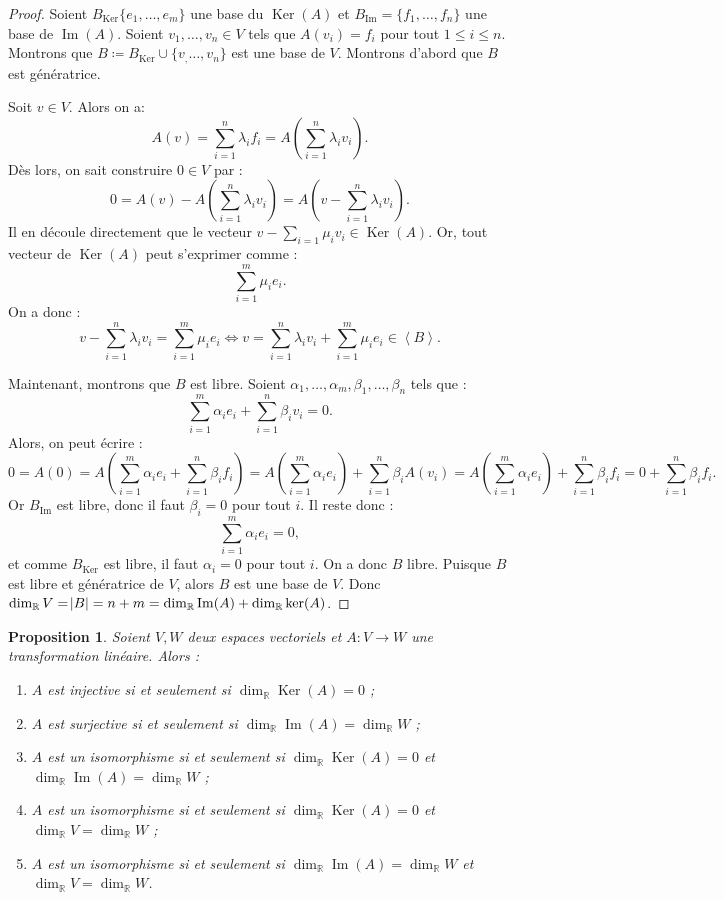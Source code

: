 \documentclass{article}
\DeclareMathOperator{\Ker}{Ker}
\DeclareMathOperator{\Imf}{Im}
\newcommand{\R}{\mathbb R}
\newcommand{\eng}[1]{\left\langle#1\right\rangle}
\newtheorem{prp}[thm]{Proposition}
\theoremstyle{definition}
\theoremstyle{remark}
\begin{document}
		\begin{proof} Soient $B_{\Ker}\{e_1, \ldots, e_m\}$ une base du $\Ker(A)$ et $B_{\Imf} = \{f_1, \ldots, f_n\}$ une base de $\Imf(A)$. Soient $v_1, \ldots, v_n \in V$
		tels que $A(v_i) = f_i$ pour tout $1 \leq i \leq n$. Montrons que $B \coloneqq B_{\Ker} \cup \{v_, \ldots, v_n\}$ est une base de $V$. Montrons d'abord que $B$
		est génératrice.

		Soit $v \in V$. Alors on a: \[A(v) = \sum_{i=1}^n\lambda_if_i = A\left(\sum_{i=1}^n\lambda_iv_i\right).\] Dès lors, on sait construire $0 \in V$ par :
		\[0 = A(v) - A\left(\sum_{i=1}^n\lambda_iv_i\right) = A\left(v-\sum_{i=1}^n\lambda_iv_i\right).\] Il en découle directement que le vecteur
		$v - \sum_{i=1}\mu_iv_i \in \Ker(A)$. Or, tout vecteur de $\Ker(A)$ peut s'exprimer comme : \[\sum_{i=1}^m\mu_ie_i.\] On a donc :
		\[v-\sum_{i=1}^n\lambda_iv_i = \sum_{i=1}^m\mu_ie_i \iff v = \sum_{i=1}^n\lambda_iv_i + \sum_{i=1}^m\mu_ie_i \in \eng B.\]

		Maintenant, montrons que $B$ est libre. Soient $\alpha_1, \ldots, \alpha_m, \beta_1, \ldots, \beta_n$ tels que :
		\[\sum_{i=1}^m\alpha_ie_i + \sum_{i=1}^n\beta_iv_i = 0.\] Alors, on peut écrire :
		\[0 = A(0) = A\left(\sum_{i=1}^m\alpha_ie_i + \sum_{i=1}^n\beta_if_i\right) = A\left(\sum_{i=1}^m\alpha_ie_i\right) + \sum_{i=1}^n\beta_iA(v_i)
		= A\left(\sum_{i=1}^m\alpha_ie_i\right) + \sum_{i=1}^n\beta_if_i = 0 + \sum_{i=1}^n\beta_if_i.\] Or $B_{\Imf}$ est libre, donc il faut $\beta_i = 0$ pour tout $i$.
		Il reste donc : \[\sum_{i=1}^m\alpha_ie_i = 0,\] et comme $B_{\Ker}$ est libre, il faut $\alpha_i = 0$ pour tout $i$. On a donc $B$ libre. Puisque $B$ est libre
		et génératrice de $V$, alors $B$ est une base de $V$. Donc $\dim_\R V = \abs B = n+m = \dim_\R\Imf(A) + \dim_\R\ker(A)$. \end{proof}

		\begin{prp}\label{condIsom} Soient $V, W$ deux espaces vectoriels et $A : V \to W$ une transformation linéaire. Alors :
		\begin{enumerate}
			\item $A$ est injective si et seulement si $\dim_\R \Ker(A) = 0$ ;
			\item $A$ est surjective si et seulement si $\dim_\R \Imf(A) = \dim_\R W$ ;
			\item $A$ est un isomorphisme si et seulement si $\dim_\R\Ker(A) = 0$ et $\dim_\R\Imf(A) = \dim_\R W$ ;
			\item $A$ est un isomorphisme si et seulement si $\dim_\R\Ker(A) = 0$ et $\dim_\R V = \dim_\R W$ ;
			\item $A$ est un isomorphisme si et seulement si $\dim_\R \Imf(A) = \dim_\R W$ et $\dim_\R V = \dim_\R W$.
		\end{enumerate}
		\end{prp}
		
\end{document}
